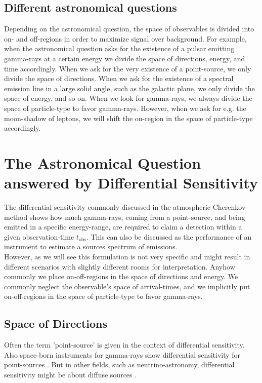 \documentclass{article}%
\begin{document}
\subsection*{Different astronomical questions}
Depending on the astronomical question, the space of observables is divided into on- and off-regions in order to maximize signal over background.
%
For example, when the astronomical question asks for the existence of a pulsar emitting gamma-rays at a certain energy we divide the space of directions, energy, and time accordingly.
%
When we ask for the very existence of a point-source, we only divide the space of directions.
%
When we ask for the existence of a spectral emission line in a large solid angle, such as the galactic plane, we only divide the space of energy, and so on.
%
When we look for gamma-rays, we always divide the space of particle-type to favor gamma-rays.
%
However, when we ask for e.g. the moon-shadow of leptons, we will shift the on-region in the space of particle-type accordingly.
%
\section{The Astronomical Question answered by Differential Sensitivity}
\label{SecAstronomicalQuastion}
The differential sensitivity commonly discussed in the atmospheric Cherenkov-method shows how much gamma-rays, coming from a point-source, and being emitted in a specific energy-range, are required to claim a detection within a given observation-time $t_\text{obs}$.
%
This can also be discussed as the performance of an instrument to estimate a sources spectrum of emissions.\\
%
However, as we will see this formulation is not very specific and might result in different scenarios with slightly different rooms for interpretation.
%
Anyhow commonly we place on-off-regions in the space of directions and energy.
%
We commonly neglect the observable's space of arrival-times, and we implicitly put on-off-regions in the space of particle-type to favor gamma-rays.
%
\subsection*{Space of Directions}
%
Often \cite{cta2018baseline,cortina2016machete} the term 'point-source' is given in the context of differential sensitivity.
%
Also space-born instruments for gamma-rays show differential sensitivity for point-sources \cite{wood2016fermiperformance}.
%
But in other fields, such as neutrino-astronomy, differential sensitivity might be about diffuse sources \cite{marinelli2021km3netarca}.
%
\end{document}
